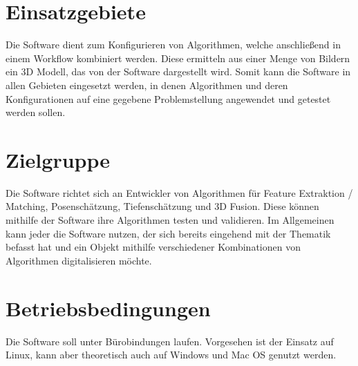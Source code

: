 \section{Einsatzgebiete}
Die Software dient zum Konfigurieren von Algorithmen, welche anschließend in einem Workflow kombiniert werden. Diese ermitteln aus einer Menge von Bildern ein 3D Modell, das von der Software dargestellt wird. Somit kann die Software in allen Gebieten eingesetzt werden, in denen Algorithmen und deren Konfigurationen auf eine gegebene Problemstellung angewendet und getestet werden sollen. 
\section{Zielgruppe}
Die Software richtet sich an Entwickler von Algorithmen für Feature Extraktion / Matching, Posenschätzung, Tiefenschätzung und 3D Fusion. Diese können mithilfe der Software ihre Algorithmen testen und validieren. Im Allgemeinen kann jeder die Software nutzen, der sich bereits eingehend mit der Thematik befasst hat und ein Objekt mithilfe verschiedener Kombinationen von Algorithmen digitalisieren möchte.
\section{Betriebsbedingungen} 
Die Software soll unter Bürobindungen laufen. Vorgesehen ist der Einsatz auf Linux, kann aber theoretisch auch auf Windows und Mac OS genutzt werden. 
